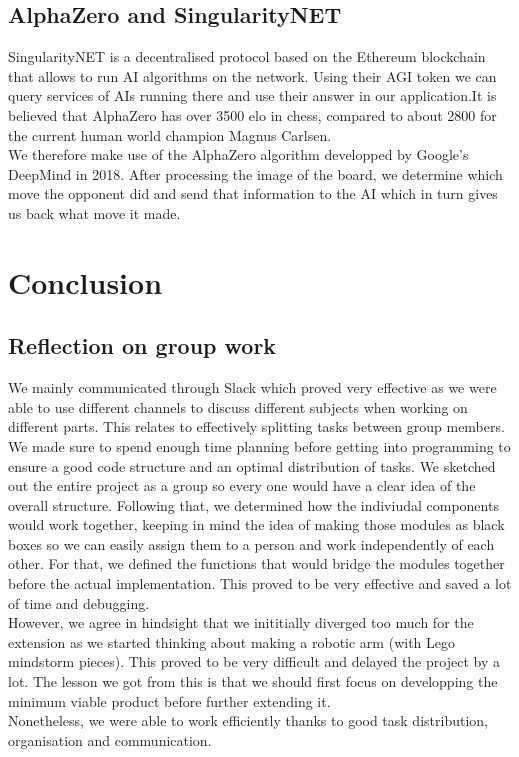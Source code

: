 \documentclass[11pt]{article}
\begin{document}
\subsection{AlphaZero and SingularityNET}

SingularityNET is a decentralised protocol based on the Ethereum blockchain that
allows to run AI algorithms on the network. Using their AGI token we can query
services of AIs running there and use their answer in our application.It is
believed that AlphaZero has over 3500 elo in chess, compared to about 2800 for
the current human world champion Magnus Carlsen.\\ We therefore make use of the
AlphaZero algorithm developped by Google's DeepMind in 2018. After processing
the image of the board, we determine which move the opponent did and send that
information to the AI which in turn gives us back what move it made.

\section{Conclusion}
\subsection{Reflection on group work}
We mainly communicated through Slack which proved very effective as we were able
to use different channels to discuss different subjects when working on
different parts. This relates to effectively splitting tasks between group
members. We made sure to spend enough time planning before getting into
programming to ensure a good code structure and an optimal distribution of
tasks. We sketched out the entire project as a group so every one would have a
clear idea of the overall structure. Following that, we determined how the
indiviudal components would work together, keeping in mind the idea of making
those modules as black boxes so we can easily assign them to a person and work
independently of each other. For that, we defined the functions that would
bridge the modules together before the actual implementation. This proved to be
very effective and saved a lot of time and debugging.\\
However, we agree in hindsight that we inititially diverged too much for the
extension as we started thinking about making a robotic arm (with Lego mindstorm
pieces). This proved to be very difficult and delayed the project by a lot. The
lesson we got from this is that we should first focus on developping the minimum
viable product before further extending it.\\
Nonetheless, we were able to work efficiently thanks to good task distribution,
organisation and communication.
\end{document}
